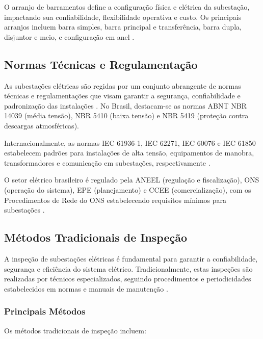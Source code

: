 O arranjo de barramentos define a configuração física e elétrica da subestação, impactando sua confiabilidade, flexibilidade operativa e custo. Os principais arranjos incluem barra simples, barra principal e transferência, barra dupla, disjuntor e meio, e configuração em anel \cite{Frontin2013}.

\subsection{Normas Técnicas e Regulamentação}

As subestações elétricas são regidas por um conjunto abrangente de normas técnicas e regulamentações que visam garantir a segurança, confiabilidade e padronização das instalações \cite{ABNT2021}. No Brasil, destacam-se as normas ABNT NBR 14039 (média tensão), NBR 5410 (baixa tensão) e NBR 5419 (proteção contra descargas atmosféricas).

Internacionalmente, as normas IEC 61936-1, IEC 62271, IEC 60076 e IEC 61850 estabelecem padrões para instalações de alta tensão, equipamentos de manobra, transformadores e comunicação em subestações, respectivamente \cite{ABNT2021}.

O setor elétrico brasileiro é regulado pela ANEEL (regulação e fiscalização), ONS (operação do sistema), EPE (planejamento) e CCEE (comercialização), com os Procedimentos de Rede do ONS estabelecendo requisitos mínimos para subestações \cite{ONS2020}.

\subsection{Métodos Tradicionais de Inspeção}

A inspeção de subestações elétricas é fundamental para garantir a confiabilidade, segurança e eficiência do sistema elétrico. Tradicionalmente, estas inspeções são realizadas por técnicos especializados, seguindo procedimentos e periodicidades estabelecidos em normas e manuais de manutenção \cite{Silva2019}.

\subsubsection{Principais Métodos}

Os métodos tradicionais de inspeção incluem:

